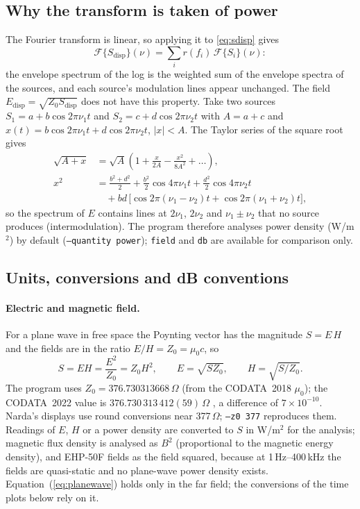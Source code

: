 \documentclass[10pt,letterpaper]{article}
\numberwithin{equation}{section}
\begin{document}
\subsection{Why the transform is taken of power}\label{sec:whypower}
The Fourier transform is linear, so applying it to \eqref{eq:sdisp} gives
\begin{equation}
\mathcal{F}\{S_\mathrm{disp}\}(\nu) = \sum_i r(f_i)\,\mathcal{F}\{S_i\}(\nu):
\label{eq:linear}
\end{equation}
the envelope spectrum of the log is the weighted sum of the envelope spectra of
the sources, and each source's modulation lines appear unchanged. The field
$E_\mathrm{disp} = \sqrt{Z_0 S_\mathrm{disp}}$ does not have this property. Take
two sources $S_1 = a + b\cos 2\pi\nu_1 t$ and $S_2 = c + d\cos 2\pi\nu_2 t$ with
$A = a+c$ and $x(t) = b\cos 2\pi\nu_1 t + d\cos 2\pi\nu_2 t$, $|x| < A$. The
Taylor series of the square root gives
\begin{align}
\sqrt{A + x} &= \sqrt{A}\left(1 + \frac{x}{2A} - \frac{x^2}{8A^2} + \dots\right),\\
x^2 &= \frac{b^2+d^2}{2} + \frac{b^2}{2}\cos 4\pi\nu_1 t + \frac{d^2}{2}\cos 4\pi\nu_2 t \nonumber\\
 &\quad + bd\,\big[\cos 2\pi(\nu_1-\nu_2)t + \cos 2\pi(\nu_1+\nu_2)t\big],
\end{align}
so the spectrum of $E$ contains lines at $2\nu_1$, $2\nu_2$ and
$\nu_1\pm\nu_2$ that no source produces (intermodulation). The program
therefore analyses power density (W/m$^2$) by default (\texttt{--quantity power});
\texttt{field} and \texttt{db} are available for comparison only.

\subsection{Units, conversions and dB conventions}\label{sec:units}
\paragraph{Electric and magnetic field.}
For a plane wave in free space the Poynting vector has the magnitude
$S = E\,H$ and the fields are in the ratio $E/H = Z_0 = \mu_0 c$, so
\begin{equation}
S = E H = \frac{E^2}{Z_0} = Z_0 H^2,\qquad E = \sqrt{S Z_0},\qquad H = \sqrt{S/Z_0}.
\label{eq:planewave}
\end{equation}
The program uses $Z_0 = 376.730313668\,\Omega$ (from the CODATA~2018 $\mu_0$); the
CODATA~2022 value is $376.730\,313\,412(59)\,\Omega$ \cite{B32}, a difference of
$7\times10^{-10}$. Narda's displays use round conversions near 377\,$\Omega$;
\texttt{--z0 377} reproduces them. Readings of $E$, $H$ or a power density are
converted to $S$ in W/m$^2$ for the analysis; magnetic flux density is analysed
as $B^2$ (proportional to the magnetic energy density), and EHP-50F fields as
the field squared, because at 1\,Hz--400\,kHz the fields are quasi-static and no
plane-wave power density exists. Equation~(\ref{eq:planewave}) holds only in the
far field; the conversions of the time plots below rely on it.
\end{document}
